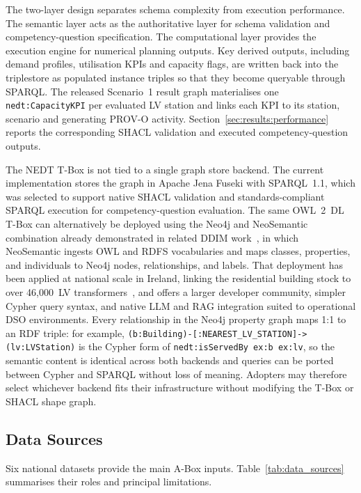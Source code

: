 \documentclass[preprint,12pt]{elsarticle}
\begin{document}
The two-layer design separates schema complexity from execution performance.
The semantic layer acts as the authoritative layer for schema validation and
competency-question specification.
The computational layer provides the execution engine for numerical planning
outputs.
Key derived outputs, including demand profiles, utilisation KPIs and
capacity flags, are written back into the triplestore as populated instance
triples so that they become queryable through SPARQL. The released Scenario~1
result graph materialises one \texttt{nedt:CapacityKPI} per evaluated LV
station and links each KPI to its station, scenario and generating PROV-O
activity. Section~\ref{sec:results:performance} reports the corresponding
SHACL validation and executed competency-question outputs.


The NEDT T-Box is not tied to a single graph store backend. The current
implementation stores the graph in Apache Jena Fuseki with SPARQL~1.1,
which was selected to support native SHACL validation and
standards-compliant SPARQL execution for competency-question evaluation.
The same OWL~2~DL T-Box can alternatively be deployed using the Neo4j
and NeoSemantic combination already demonstrated in related DDIM
work~\cite{hoare_linked_2022}, in which NeoSemantic ingests OWL and RDFS
vocabularies and maps classes, properties, and individuals to Neo4j
nodes, relationships, and labels. That deployment has been applied at
national scale in Ireland, linking the residential building stock to
over 46{,}000~LV transformers~\cite{hoare_linked_2022}, and offers a larger
developer community, simpler Cypher query syntax, and native LLM and RAG
integration suited to operational DSO environments. Every relationship in
the Neo4j property graph maps 1:1 to an RDF triple: for example,
\texttt{(b:Building)-[:NEAREST\_LV\_STATION]->(lv:LVStation)} is the
Cypher form of \texttt{nedt:isServedBy ex:b ex:lv}, so the semantic
content is identical across both backends and queries can be ported
between Cypher and SPARQL without loss of meaning. Adopters may
therefore select whichever backend fits their infrastructure without
modifying the T-Box or SHACL shape graph.


\subsection{Data Sources}
\label{sec:data-sources}

Six national datasets provide the main A-Box inputs.
Table~\ref{tab:data_sources} summarises their roles and principal
limitations.
\end{document}
